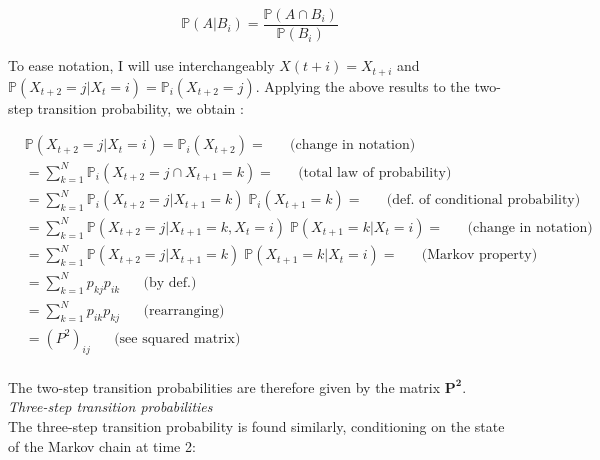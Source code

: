 \documentclass[\main/main.tex]{subfiles}
\begin{document}
\begin{equation}
    \mathds{P}(A | B_i) = \frac{\mathds{P}(A \cap B_i)}{\mathds{P}(B_i)}
\end{equation}

\noindent To ease notation, I will use interchangeably $X(t+i) = X_{t+i}$ and $\mathds{P} ( X_{t+2} = j | X_t = i) =  \mathds{P}_i ( X_{t+2} = j)$.
Applying the above results to the two-step transition probability, we obtain \citep{Holmes2015CourseProcesses}:


\begin{equation}
\begin{split}
&\mathds{P} ( X_{t+2}= j | X_t = i) = \mathds{P}_i ( X_{t+2}) = \; \; \; \; \; \;  \text{(change in notation)}\\
&= \sum_{k= 1}^{N}  \mathds{P}_i  ( X_{t+2} = j \cap X_{t+1} = k) = \; \; \; \; \; \;  \text{(total law of probability)}\\
&= \sum_{k= 1}^{N} \mathds{P}_i  ( X_{t+2} = j | X_{t+1} = k)\; \mathds{P}_i  (X_{t+1} = k) = \; \; \; \; \; \;  \text{(def. of conditional probability)}\\
&= \sum_{k= 1}^{N} \mathds{P}  ( X_{t+2} = j | X_{t+1} = k, X_{t} = i)\; \mathds{P}  (X_{t+1} = k | X_{t} = i) = \; \; \; \; \; \;  \text{(change in notation)}\\
&= \sum_{k= 1}^{N} \mathds{P}  ( X_{t+2} = j | X_{t+1} = k)\; \mathds{P}  (X_{t+1} = k | X_{t} = i) = \; \; \; \; \; \;  \text{(Markov property)}\\
&= \sum_{k= 1}^{N} p_{kj}p_{ik} \; \; \; \; \; \;  \text{(by def.)}\\
&= \sum_{k= 1}^{N} p_{ik}p_{kj} \; \; \; \; \; \;  \text{(rearranging)}\\
&= (P^2)_{ij} \; \; \; \; \; \;  \text{(see squared matrix)}\\
\end{split}
\end{equation}

The two-step transition probabilities are therefore given by the matrix $\mathbf{P^2}$.\\


\noindent \textit{Three-step transition probabilities}\\

The three-step transition probability is found similarly, conditioning on the state of the Markov chain at time 2:
\end{document}
